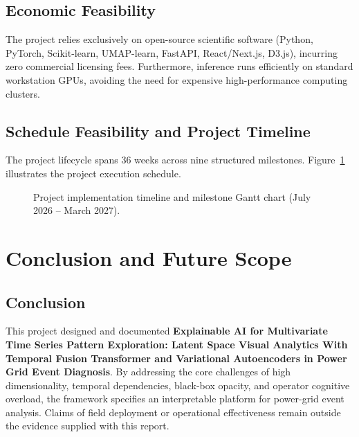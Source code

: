 \documentclass[12pt,a4paper]{report}
\begin{document}
\section{Economic Feasibility}
The project relies exclusively on open-source scientific software (Python, PyTorch, Scikit-learn, UMAP-learn, FastAPI, React/Next.js, D3.js), incurring zero commercial licensing fees. Furthermore, inference runs efficiently on standard workstation GPUs, avoiding the need for expensive high-performance computing clusters.

\section{Schedule Feasibility and Project Timeline}
The project lifecycle spans 36 weeks across nine structured milestones. Figure~\ref{fig:project_gantt} illustrates the project execution schedule.

\begin{figure}[H]
    \centering
    \caption{Project implementation timeline and milestone Gantt chart (July 2026 -- March 2027).}
    \label{fig:project_gantt}
\end{figure}


\chapter{Conclusion and Future Scope}

\section{Conclusion}
This project designed and documented \textbf{Explainable AI for Multivariate Time Series Pattern Exploration: Latent Space Visual Analytics With Temporal Fusion Transformer and Variational Autoencoders in Power Grid Event Diagnosis}. By addressing the core challenges of high dimensionality, temporal dependencies, black-box opacity, and operator cognitive overload, the framework specifies an interpretable platform for power-grid event analysis. Claims of field deployment or operational effectiveness remain outside the evidence supplied with this report.
\end{document}
